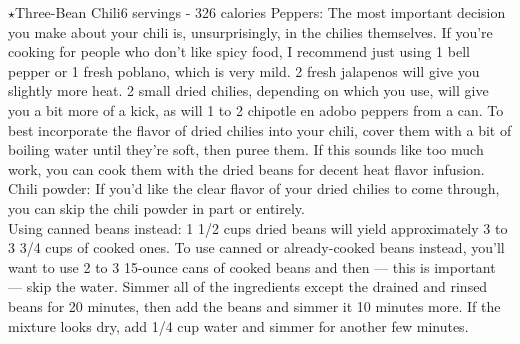 \begin{recipe}{\texorpdfstring{$\star$}{str}Three-Bean Chili}{6 servings - 326 calories}{}
Peppers: The most important decision you make about your chili is, unsurprisingly, in the chilies themselves. If you're cooking for people who don't like spicy food, I recommend just using 1 bell pepper or 1 fresh poblano, which is very mild. 2 fresh jalapenos will give you slightly more heat. 2 small dried chilies, depending on which you use, will give you a bit more of a kick, as will 1 to 2 chipotle en adobo peppers from a can. To best incorporate the flavor of dried chilies into your chili, cover them with a bit of boiling water until they’re soft, then puree them. If this sounds like too much work, you can cook them with the dried beans for decent heat flavor infusion.\\

Chili powder: If you’d like the clear flavor of your dried chilies to come through, you can skip the chili powder in part or entirely.\\

Using canned beans instead: 1 1/2 cups dried beans will yield approximately 3 to 3 3/4 cups of cooked ones. To use canned or already-cooked beans instead, you’ll want to use 2 to 3 15-ounce cans of cooked beans and then — this is important — skip the water. Simmer all of the ingredients except the drained and rinsed beans for 20 minutes, then add the beans and simmer it 10 minutes more. If the mixture looks dry, add 1/4 cup water and simmer for another few minutes.

\end{recipe}